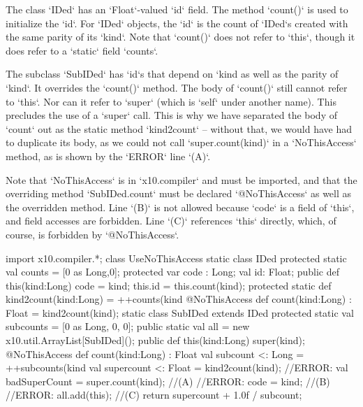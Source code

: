 \begin{ex}

The class \xcd`IDed` has an \xcd`Float`-valued \xcd`id` field.  The method
\xcd`count()` is used to initialize the \xcd`id`.  For \xcd`IDed` objects,
the \xcd`id` is the count of \xcd`IDed`s created with the same parity of its
\xcd`kind`.   Note that \xcd`count()` does not refer to \xcd`this`, though
it does refer to a \xcd`static` field \xcd`counts`. 

The subclass \xcd`SubIDed` has \xcd`id`s that depend on \xcd`kind%
as well as the parity of \xcd`kind`.  It overrides the \xcd`count()`
method.  The body of \xcd`count()` still cannot refer to \xcd`this`.
Nor can it refer to \xcd`super` (which is \xcd`self` under another name).
This precludes the use of a \xcd`super` call.  This is why we have separated
the body of \xcd`count` out as the static method \xcd`kind2count` -- without
that, we would have had to duplicate its body, as we could not call 
\xcd`super.count(kind)` in a \xcd`NoThisAccess` method, as is shown by 
the \xcd`ERROR` line \xcd`(A)`. 

Note that \xcd`NoThisAccess` is in \xcd`x10.compiler` and must be imported,
and that the overriding method \xcd`SubIDed.count` must be declared
\xcd`@NoThisAccess` as well as the overridden method.
Line \xcd`(B)` is not allowed because \xcd`code` is a field of \xcd`this`, 
and field accesses are forbidden.   Line \xcd`(C)` references \xcd`this`
directly, which, of course, is forbidden by \xcd`@NoThisAccess`.  


\begin{xten}
import x10.compiler.*;
class UseNoThisAccess {
  static class IDed {
    protected static val counts = [0 as Long,0];
    protected var code : Long;
    val id: Float;
    public def this(kind:Long) { 
      code = kind;
      this.id = this.count(kind); 
    }
    protected static def kind2count(kind:Long) = ++counts(kind %
    @NoThisAccess def count(kind:Long) : Float = kind2count(kind);
  }
  static class SubIDed extends IDed {
    protected static val subcounts = [0 as Long, 0, 0];
    public static val all = new x10.util.ArrayList[SubIDed]();
    public def this(kind:Long) { 
       super(kind); 
    }
    @NoThisAccess
    def count(kind:Long) : Float {
       val subcount <: Long = ++subcounts(kind %
       val supercount <: Float = kind2count(kind);
       //ERROR: val badSuperCount = super.count(kind); //(A)
       //ERROR: code = kind;                           //(B)
       //ERROR: all.add(this);                         //(C)
       return  supercount + 1.0f / subcount;
    }
  }
}
\end{xten}
%


\end{ex}

